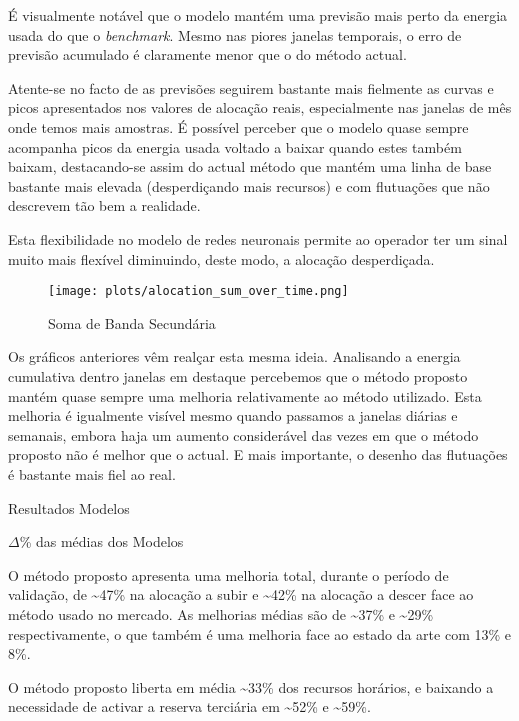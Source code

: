 É visualmente notável que o modelo mantém uma previsão mais perto da energia usada do que o \textit{benchmark}. Mesmo nas piores janelas temporais, o erro de previsão acumulado é claramente menor que o do método actual.\par
Atente-se no facto de as previsões seguirem bastante mais fielmente as curvas e picos apresentados nos valores de alocação reais, especialmente nas janelas de mês onde temos mais amostras. É possível perceber que o modelo quase sempre acompanha picos da energia usada voltado a baixar quando estes também baixam, destacando-se assim do actual método que mantém uma linha de base bastante mais elevada (desperdiçando mais recursos) e com flutuações que não descrevem tão bem a realidade.\par
Esta flexibilidade no modelo de redes neuronais permite ao operador ter um sinal muito mais flexível diminuindo, deste modo, a alocação desperdiçada.\par

\begin{figure}[H]
    \centering
    \texttt{[image: plots/alocation\_sum\_over\_time.png]}
    \caption{Soma de Banda Secundária}
    \label{fig:mltimewindowssum}
\end{figure}

Os gráficos anteriores vêm realçar esta mesma ideia. Analisando a energia cumulativa dentro janelas em destaque percebemos que o método proposto mantém quase sempre uma melhoria relativamente ao método utilizado. Esta melhoria é igualmente visível mesmo quando passamos a janelas diárias e semanais, embora haja um aumento considerável das vezes em que o método proposto não é melhor que o actual. E mais importante, o desenho das flutuações é bastante mais fiel ao real.\par


\begin{table}[H]
    \centering
    \caption{Resultados Modelos}    
    \resizebox{0.8\linewidth}{!}{}
    \label{tab:mlres}
    \end{table}



\begin{table}[H]
    \caption{$\Delta$\% das médias dos Modelos}    
    \resizebox{\linewidth}{!}{}
    \label{tab:mlres_deltas}
    \end{table}

O método proposto apresenta uma melhoria total, durante o período de validação, de \textasciitilde47\% na alocação a subir e \textasciitilde42\% na alocação a descer face ao método usado no mercado. As melhorias médias são de \textasciitilde37\% e \textasciitilde29\% respectivamente, o que também é uma melhoria face ao estado da arte \cite{Algarvio2024} com 13\% e 8\%.\par
O método proposto liberta em média \textasciitilde33\% dos recursos horários, e baixando a necessidade de activar a reserva terciária em \textasciitilde52\% e \textasciitilde59\%.\par

